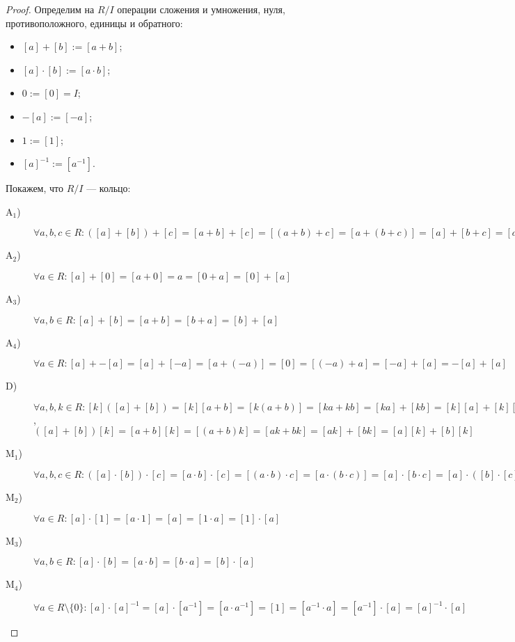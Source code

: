 \documentclass[12pt,a4paper]{article}
\newcommand{\A}{\ensuremath{\mathrm{A}}\xspace}
\newcommand{\D}{\ensuremath{\mathrm{D}}\xspace}
\newcommand{\M}{\ensuremath{\mathrm{M}}\xspace}
\begin{document}
\begin{proof}
        Определим на $R/I$ операции сложения и умножения, нуля, противоположного, единицы и обратного:
        \begin{itemize}
            \item $[a] + [b] := [a + b]$;
            \item $[a] \cdot [b] := [a \cdot b]$;
            \item $0 := [0] = I$;
            \item $-[a] := [-a]$;
            \item $1 := [1]$;
            \item $[a]^{-1} := [a^{-1}]$.
        \end{itemize}
        Покажем, что $R/I$ --- кольцо:
        \begin{description}
            \item[$\A_1$)] $\forall a, b, c \in R: ([a] + [b]) + [c] = [a + b] + [c] = [(a + b) + c] = [a + (b + c)] = [a] + [b + c] = [a] + ([b] + [c])$
            \item[$\A_2$)] $\forall a \in R: [a] + [0] = [a + 0] = a = [0 + a] = [0] + [a]$
            \item[$\A_3$)] $\forall a, b \in R: [a] + [b] = [a + b] = [b + a] = [b] + [a]$
            \item[$\A_4$)] $\forall a \in R: [a] + -[a] = [a] + [-a] = [a + (-a)] = [0] = [(-a) + a] = [-a] + [a] = -[a] + [a]$
            \item[$\D$)] $\forall a, b, k \in R: [k]([a] + [b]) = [k][a + b] = [k(a + b)] = [ka + kb] = [ka] + [kb] = [k][a] + [k][b]$, $([a] + [b])[k] = [a + b][k] = [(a + b)k] = [ak + bk] = [ak] + [bk] = [a][k] + [b][k]$
            \item[$\M_1$)] $\forall a, b, c \in R: ([a] \cdot [b]) \cdot [c] = [a \cdot b] \cdot [c] = [(a \cdot b) \cdot c] = [a \cdot (b \cdot c)] = [a] \cdot [b \cdot c] = [a] \cdot ([b] \cdot [c])$
            \item[$\M_2$)] $\forall a \in R: [a] \cdot [1] = [a \cdot 1] = [a] = [1 \cdot a] = [1] \cdot [a]$
            \item[$\M_3$)] $\forall a, b \in R: [a] \cdot [b] = [a \cdot b] = [b \cdot a] = [b] \cdot [a]$
            \item[$\M_4$)] $\forall a \in R \setminus \{0\}: [a] \cdot [a]^{-1} = [a] \cdot [a^{-1}] = [a \cdot a^{-1}] = [1] = [a^{-1} \cdot a] = [a^{-1}] \cdot [a] = [a]^{-1} \cdot [a]$
        \end{description}
    \end{proof}
\end{document}
